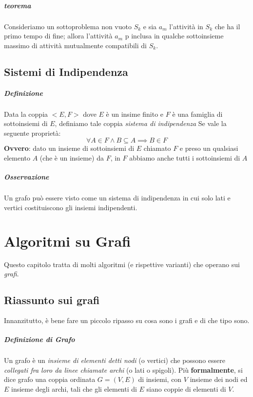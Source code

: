 \documentclass[12pt, a4paper, openany]{book}
\begin{document}
\paragraph*{teorema} Consideriamo un sottoproblema non vuoto $S_k$ e sia $a_m$ l'attività in $S_k$ che ha il primo tempo di fine; allora l'attività $a_m$ p inclusa in qualche sottoinsieme massimo di attività mutualmente compatibili di $S_k$.

\section{Sistemi di Indipendenza}
\paragraph*{Definizione} Data la coppia $<E,F>$ dove $E$ è un insime finito e $F$ è una famiglia di sottoinsiemi di $E$, definiamo tale coppia \emph{sistema di indipendenza} Se vale la seguente proprietà:
$$\forall A \in F \wedge B\subseteq A \implies B \in F$$
\textbf{Ovvero}: dato un insieme di sottoinsiemi di $E$ chiamato $F$ e preso un qualsiasi elemento $A$ (che è un insieme) da $F$, in $F$ abbiamo anche tutti i sottoinsiemi di $A$

\paragraph*{Osservazione} Un grafo può essere visto come un sistema di indipendenza in cui solo lati e vertici costituiscono gli insiemi indipendenti.

\chapter{Algoritmi su Grafi}
Questo capitolo tratta di molti algoritmi (e rispettive varianti) che operano sui \emph{grafi}.

\section{Riassunto sui grafi}
Innanzitutto, è bene fare un piccolo ripasso su cosa sono i grafi e di che tipo sono.

\paragraph{Definizione di Grafo} Un grafo è un \emph{insieme di elementi detti nodi} (o vertici) che possono essere \emph{collegati fra loro da linee chiamate archi} (o lati o spigoli).
Più \textbf{formalmente}, si dice grafo una coppia ordinata $G=(V,E)$ di insiemi, con $V$ insieme dei nodi ed $E$ insieme degli archi, tali che gli elementi di $E$ siano coppie di elementi di $V$.
\end{document}
